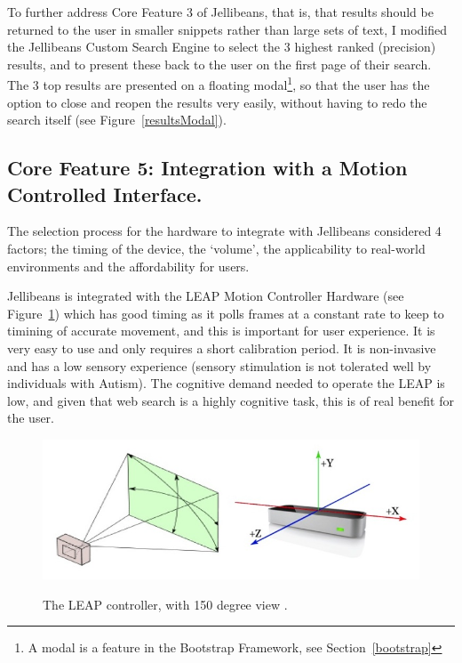 \documentclass[a4paper, 11pt]{article}
\begin{document}
\vspace{5mm} %
To further address Core Feature 3 of Jellibeans, that is, that results should be returned to the user in smaller snippets rather than large sets of text, I modified the Jellibeans Custom Search Engine to select the 3 highest ranked (precision) results, and to present these back to the user on the first page of their search. The 3 top results are presented on a floating modal\footnote{A modal is a feature in the Bootstrap Framework, see Section~\ref{bootstrap}}, so that the user has the option to close and reopen the results very easily, without having to redo the search itself (see Figure~\ref{resultsModal}).


\subsection{Core Feature 5: Integration with a Motion Controlled Interface.}

The selection process for the hardware to integrate with Jellibeans considered 4 factors; the timing of the device, the `volume', the applicability to real-world environments and the affordability for users.

\vspace{5mm}
Jellibeans is integrated with the LEAP Motion Controller Hardware (see Figure~\ref{leap}) which has good timing as it polls frames at a constant rate to keep to timining of accurate movement, and this is important for user experience. It is very easy to use and only requires a short calibration period. It is non-invasive and has a low sensory experience (sensory stimulation is not tolerated well by individuals with Autism). The cognitive demand needed to operate the LEAP is low, and given that web search is a highly cognitive task, this is of real benefit for the user.

\begin{figure}[H]
\begin{center}
\includegraphics[scale=0.3]{leap}\\
\caption{The LEAP controller, with 150 degree view \cite{leap}.}
\label{leap}
\end{center}
\end{figure}
\end{document}
